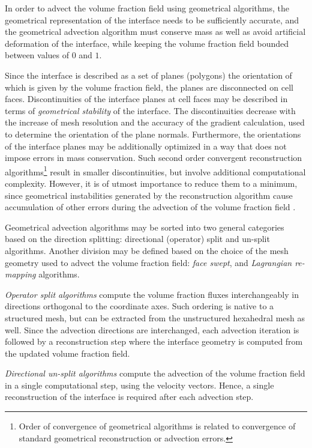 In order to advect the volume fraction field using geometrical algorithms, the
geometrical representation of the interface needs to be sufficiently accurate,
and the geometrical advection algorithm must conserve mass as well as avoid
artificial deformation of the interface, while keeping the volume fraction
field bounded between values of $0$ and $1$. 

Since the interface is described as a set of planes (polygons) the orientation 
of which is given by the volume fraction field, the planes are disconnected
on cell faces. Discontinuities of the interface planes at cell faces may be 
described in terms of \emph{geometrical stability} of the interface.
The discontinuities decrease with the increase of mesh
resolution and the accuracy of the gradient calculation, used to determine the
orientation of the plane normals. Furthermore, the orientations of the
interface planes may be additionally optimized in a way that does not impose
errors in mass conservation. Such second order convergent reconstruction
algorithms\footnote{Order of convergence of geometrical algorithms is related
to convergence of standard geometrical reconstruction or advection errors.}
result in smaller discontinuities, but involve additional computational
complexity. However, it is of utmost importance to reduce them to a minimum, 
since geometrical instabilities generated by the reconstruction algorithm cause
accumulation of other errors during the advection of the volume fraction field
\citep{Cerne2002}. 

Geometrical advection algorithms may be sorted into two general categories
based on the direction splitting: directional (operator) split and un-split
algorithms. Another division may be defined based on the choice of the mesh
geometry used to advect the volume fraction field: \emph{face swept}, and
\emph{Lagrangian re-mapping} algorithms. 

\emph{Operator split algorithms} compute the volume fraction fluxes
interchangeably in directions orthogonal to the coordinate axes. Such ordering
is native to a structured mesh, but can be extracted from the unstructured
hexahedral mesh as well. Since the advection directions are interchanged, each
advection iteration is followed by a reconstruction step where the interface
geometry is computed from the updated volume fraction field. 

\emph{Directional un-split algorithms} compute the advection of the volume
fraction field in a single computational step, using the velocity vectors.
Hence, a single reconstruction of the interface is required after each
advection step.

